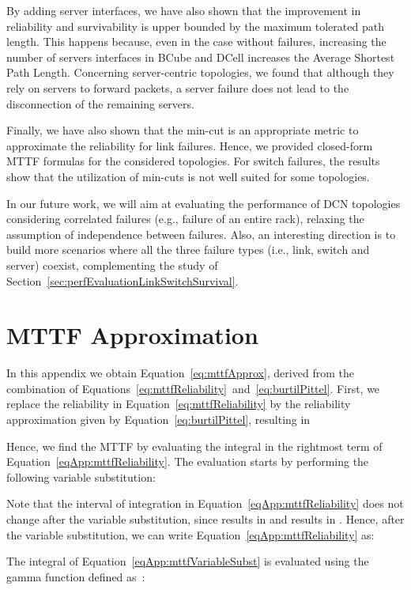 By adding server interfaces, we have also shown that the improvement in reliability and survivability is upper bounded by the maximum tolerated path length. This happens because, even in the case without failures, increasing the number of servers interfaces in BCube and DCell increases the Average Shortest Path Length. Concerning server-centric topologies, we found that although they rely on servers to forward packets, a server failure does not lead to the disconnection of the remaining servers. 

Finally, we have also shown that the min-cut is an appropriate metric to approximate the reliability for link failures. Hence, we provided closed-form MTTF formulas for the considered topologies. For switch failures, the results show that the utilization of min-cuts is not well suited for some topologies.

In our future work, we will aim at evaluating the performance of DCN topologies considering correlated failures (e.g., failure of an entire rack), relaxing the assumption of independence between failures. Also, an interesting direction is to build more scenarios where all the three failure types (i.e., link, switch and server) coexist, complementing the study of Section~\ref{sec:perfEvaluationLinkSwitchSurvival}. 

\appendix

\section{MTTF Approximation}
\label{app:compMTTFapprox}

In this appendix we obtain Equation~\ref{eq:mttfApprox}, derived from the combination of Equations~\ref{eq:mttfReliability}~and~\ref{eq:burtilPittel}.
First, we replace the reliability  in Equation~\ref{eq:mttfReliability} by the reliability approximation given by 
Equation~\ref{eq:burtilPittel}, resulting in

Hence, we find the MTTF by evaluating the integral in the rightmost term of Equation~\ref{eqApp:mttfReliability}.
The evaluation starts by performing the following variable substitution: 

Note that the interval of integration in Equation~\ref{eqApp:mttfReliability} does not change after the variable substitution, since  results in 
 and  results in .
Hence, after the variable substitution, we can write Equation~\ref{eqApp:mttfReliability} as:

The integral of Equation~\ref{eqApp:mttfVariableSubst} is evaluated using the gamma function defined as~\cite{abramowitz1970handbook}:

